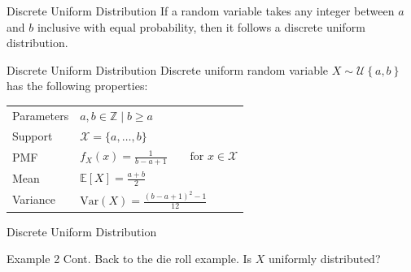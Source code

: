 \documentclass[10pt]{beamer}
\begin{document}
\begin{frame}[fragile]{Discrete Uniform Distribution}
If a random variable takes any integer between \(a\) and \(b\) inclusive with equal probability, then it follows a discrete uniform distribution.

\begin{alertblock}{Discrete Uniform Distribution}
Discrete uniform random variable \(X \sim \mathcal{U}\left\{a, b\right\}\) has the following properties:
  \begin{table}
    \begin{tabular}{ll}
      \toprule
      Parameters & \(a, b \in \mathbb{Z} \mid b \geq a\)\\
      Support & \(\mathcal{X} = \{a,\dots, b\}\)\\
      PMF & \(f_X\left(x\right) = \frac{1}{b - a + 1}\qquad\textrm{for }x \in \mathcal{X}\)\\
      Mean & \(\mathbb{E}\left[X\right] = \frac{a + b}{2}\)\\
      Variance & \(\textrm{Var}\left(X\right) = \frac{\left(b - a + 1\right)^2 - 1}{12}\)\\
      \bottomrule
    \end{tabular}
  \end{table}
\end{alertblock}
\end{frame}

\begin{frame}[fragile]{Discrete Uniform Distribution}
\begin{exampleblock}{Example 2 Cont.}
Back to the die roll example. Is \(X\) uniformly distributed?

\end{exampleblock}
\end{frame}
\end{document}
